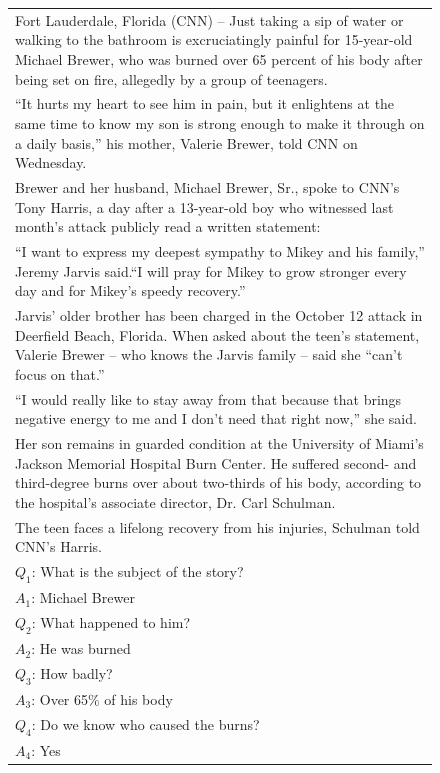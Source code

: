 \begin{figure}[!h]
\small
\center
\begin{tabular}{p{}}
\midrule
Fort Lauderdale, Florida (CNN) -- Just taking a sip of water or walking to the bathroom is excruciatingly painful for 15-year-old Michael Brewer, who was burned over 65 percent of his body after being set on fire, allegedly by a group of teenagers. \\
``It hurts my heart to see him in pain, but it enlightens at the same time to know my son is strong enough to make it through on a daily basis,'' his mother, Valerie Brewer, told CNN on Wednesday. \\
Brewer and her husband, Michael Brewer, Sr., spoke to CNN's Tony Harris, a day after a 13-year-old boy who witnessed last month's attack publicly read a written statement: \\
``I want to express my deepest sympathy to Mikey and his family,'' Jeremy Jarvis said.``I will pray for Mikey to grow stronger every day and for Mikey's speedy recovery.'' \\
Jarvis' older brother has been charged in the October 12 attack in Deerfield Beach, Florida. When asked about the teen's statement, Valerie Brewer -- who knows the Jarvis family -- said she ``can't focus on that.'' \\
``I would really like to stay away from that because that brings negative energy to me and I don't need that right now,'' she said. \\
Her son remains in guarded condition at the University of Miami's Jackson Memorial Hospital Burn Center. He suffered second- and third-degree burns over about two-thirds of his body, according to the hospital's associate director, Dr. Carl Schulman. \\
The teen faces a lifelong recovery from his injuries, Schulman told CNN's Harris.  \\
\vspace{0em}
$Q_1$: What is the subject of the story? \\
$A_1$: Michael Brewer \\
\vspace{0em}
$Q_2$: What happened to him?\\
$A_2$: He was burned \\
\vspace{0em}
$Q_3$: How badly?\\
$A_3$: Over 65\% of his body \\
\vspace{0em}
$Q_4$: Do we know who caused the burns?\\
$A_4$: Yes \\
\bottomrule
\end{tabular}
\end{figure}

